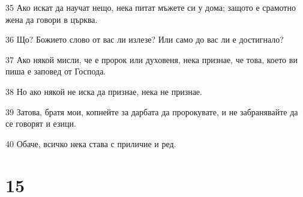 \par 35 Ако искат да научат нещо, нека питат мъжете си у дома; защото е срамотно жена да говори в църква.
\par 36 Що? Божието слово от вас ли излезе? Или само до вас ли е достигнало?
\par 37 Ако някой мисли, че е пророк или духовеня, нека признае, че това, което ви пиша е заповед от Господа.
\par 38 Но ако някой не иска да признае, нека не признае.
\par 39 Затова, братя мои, копнейте за дарбата да пророкувате, и не забранявайте да се говорят и езици.
\par 40 Обаче, всичко нека става с приличие и ред.

\chapter{15}

